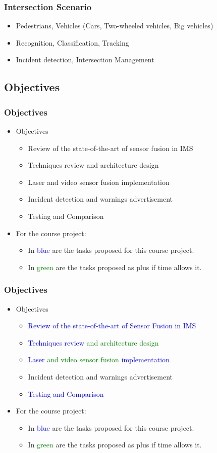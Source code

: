 \documentclass[table]{beamer}
\begin{document}
\frame
{
	\frametitle{Intersection Scenario}
	\begin{itemize}
		\item Pedestrians, Vehicles (Cars, Two-wheeled vehicles, Big vehicles)
		\item Recognition, Classification, Tracking
		\item Incident detection, Intersection Management
	\end{itemize}
}
\subsection{Objectives}

\frame
{
	\frametitle{Objectives}
	\begin{itemize}
	\item Objectives
		\begin{itemize}
			\item Review of the state-of-the-art of sensor fusion in IMS
			\item Techniques review and architecture design 
			\item Laser and video sensor fusion implementation
			\item Incident detection and warnings advertisement
			\item Testing and Comparison
		\end{itemize}
	\item<2-> For the course project:
		\begin{itemize}
			\item<2-> In \textcolor{blue}{blue} are the tasks proposed for this course project.
			\item<2-> In \textcolor{green}{green} are the tasks proposed as plus if time allows it.
		\end{itemize}
	\end{itemize}
}
\frame
{
	\frametitle{Objectives}
	\begin{itemize}
	\item Objectives
		\begin{itemize}
			\item \textcolor{blue}{Review of the state-of-the-art of Sensor Fusion in IMS}
			\item \textcolor{blue}{Techniques review} \textcolor{green}{and architecture design}
			\item \textcolor{blue}{Laser} \textcolor{green}{and video sensor fusion} \textcolor{blue}{implementation}
			\item Incident detection and warnings advertisement
			\item \textcolor{blue}{Testing and Comparison}
		\end{itemize}
	\item For the course project:
		\begin{itemize}
			\item In \textcolor{blue}{blue} are the tasks proposed for this course project.
			\item In \textcolor{green}{green} are the tasks proposed as plus if time allows it.
		\end{itemize}
	\end{itemize}
}
\end{document}
